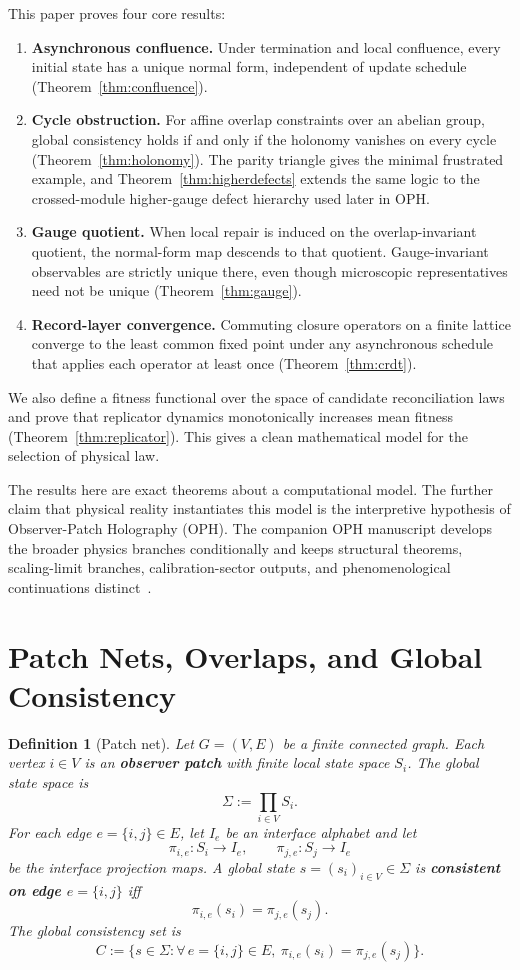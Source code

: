 \documentclass[11pt]{article}
\newtheorem{definition}[theorem]{Definition}
\theoremstyle{remark}
\theoremstyle{plain}
\begin{document}
This paper proves four core results:

\begin{enumerate}
\item \textbf{Asynchronous confluence.} Under termination and local confluence, every initial state has a unique normal form, independent of update schedule (Theorem~\ref{thm:confluence}).
\item \textbf{Cycle obstruction.} For affine overlap constraints over an abelian group, global consistency holds if and only if the holonomy vanishes on every cycle (Theorem~\ref{thm:holonomy}). The parity triangle gives the minimal frustrated example, and Theorem~\ref{thm:higherdefects} extends the same logic to the crossed-module higher-gauge defect hierarchy used later in OPH.
\item \textbf{Gauge quotient.} When local repair is induced on the overlap-invariant quotient, the normal-form map descends to that quotient. Gauge-invariant observables are strictly unique there, even though microscopic representatives need not be unique (Theorem~\ref{thm:gauge}).
\item \textbf{Record-layer convergence.} Commuting closure operators on a finite lattice converge to the least common fixed point under any asynchronous schedule that applies each operator at least once (Theorem~\ref{thm:crdt}).
\end{enumerate}

We also define a fitness functional over the space of candidate reconciliation laws and prove that replicator dynamics monotonically increases mean fitness (Theorem~\ref{thm:replicator}). This gives a clean mathematical model for the selection of physical law.

The results here are exact theorems about a computational model. The further claim that physical reality instantiates this model is the interpretive hypothesis of Observer-Patch Holography (OPH). The companion OPH manuscript develops the broader physics branches conditionally and keeps structural theorems, scaling-limit branches, calibration-sector outputs, and phenomenological continuations distinct~\cite{OPH}.


\section{Patch Nets, Overlaps, and Global Consistency}

\begin{definition}[Patch net]\label{def:patchnet}
Let $G=(V,E)$ be a finite connected graph. Each vertex $i\in V$ is an \textbf{observer patch} with finite local state space $S_i$. The global state space is
\[
\Sigma := \prod_{i\in V} S_i.
\]
For each edge $e=\{i,j\}\in E$, let $I_e$ be an interface alphabet and let
\[
\pi_{i,e}:S_i\to I_e,
\qquad
\pi_{j,e}:S_j\to I_e
\]
be the interface projection maps. A global state $s=(s_i)_{i\in V}\in\Sigma$ is \textbf{consistent on edge $e=\{i,j\}$} iff
\[
\pi_{i,e}(s_i)=\pi_{j,e}(s_j).
\]
The global consistency set is
\[
C:=\bigl\{s\in\Sigma:\forall\, e=\{i,j\}\in E,\ \pi_{i,e}(s_i)=\pi_{j,e}(s_j)\bigr\}.
\]
\end{definition}
\end{document}
